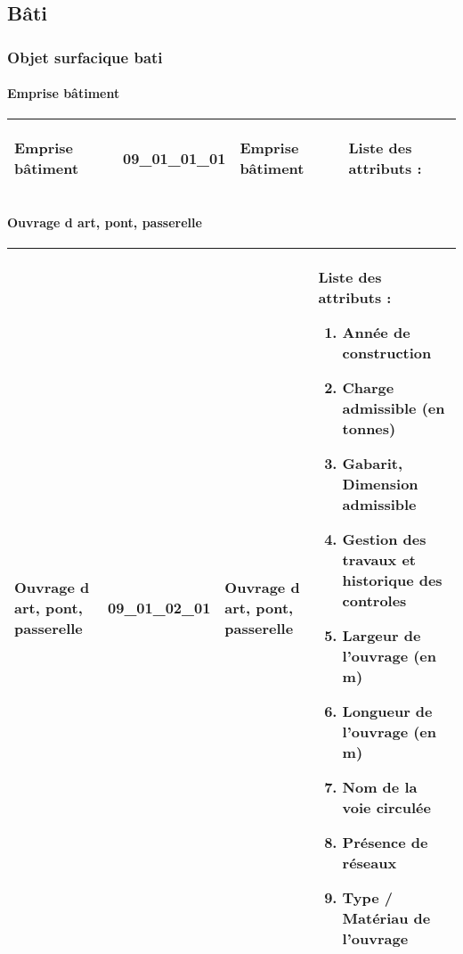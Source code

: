 \documentclass[12pt,titlepage,oneside]{book}
\begin{document}
\subsection{Bâti}
\subsubsection{\large Objet surfacique bati}
\paragraph{Emprise bâtiment}
\noindent
\vspace{\baselineskip}

\renewcommand{\arraystretch}{1.2}
\begin{supertabular}{|p{10cm}|c|p{13cm}|p{12cm}|}
 Emprise bâtiment & 09\_01\_01\_01 & Emprise bâtiment & Liste des attributs :
\begin{enumerate}
\end{enumerate}
\\
\hline
\end{supertabular}
\begin{figure}[h!]
  \hfill         %
\end{figure}


\paragraph{Ouvrage d art, pont, passerelle}
\noindent
\vspace{\baselineskip}

\renewcommand{\arraystretch}{1.2}
\begin{supertabular}{|p{10cm}|c|p{13cm}|p{12cm}|}
 Ouvrage d art, pont, passerelle & 09\_01\_02\_01 & Ouvrage d art, pont, passerelle & Liste des attributs :
\begin{enumerate}
  \item Année de construction  \item Charge admissible (en tonnes)  \item Gabarit, Dimension admissible  \item Gestion des travaux et historique des controles  \item Largeur de l'ouvrage (en m)  \item Longueur de l'ouvrage (en m)  \item Nom de la voie circulée  \item Présence de réseaux  \item Type / Matériau de l'ouvrage\end{enumerate}
\\
\hline
\end{supertabular}
\begin{figure}[h!]
  \hfill         %
\end{figure}
\end{document}
